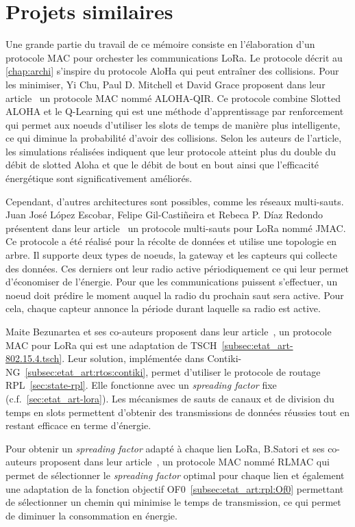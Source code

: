 \section{Projets similaires}\label{sec:etat_art-related-work}
\renewcommand{\rightmark}{Projet similaires}

Une grande partie du travail de ce mémoire consiste en l'élaboration d'un protocole MAC pour
orchester les communications LoRa. Le protocole décrit au \autoref{chap:archi} s'inspire du
protocole AloHa qui peut entraîner des collisions. Pour les minimiser, Yi Chu, Paul D. Mitchell et
David Grace proposent dans leur article~\cite{6328420} un protocole MAC nommé ALOHA-QIR. Ce
protocole combine Slotted ALOHA et le Q-Learning qui est une méthode d'apprentissage par
renforcement qui permet aux noeuds d'utiliser les slots de temps de manière plus intelligente, ce qui diminue la probabilité d'avoir des collisions. Selon les auteurs de l'article, les simulations réalisées indiquent que leur
protocole atteint plus du double du débit de slotted Aloha et que le débit de bout en bout ainsi
que l'efficacité énergétique sont significativement améliorés.


Cependant, d'autres architectures sont possibles, comme les réseaux multi-sauts.
Juan José López Escobar, Felipe Gil-Castiñeira et Rebeca P. Díaz Redondo présentent dans leur 
article~\cite{s20236893} un protocole multi-sauts pour LoRa nommé JMAC. Ce protocole a été réalisé 
pour la récolte de données et utilise une topologie en arbre. Il supporte deux types de noeuds, la 
gateway et les capteurs qui collecte des données. Ces derniers ont leur radio active périodiquement 
ce qui leur permet d'économiser de l'énergie. Pour que les communications puissent s'effectuer, un 
noeud doit prédire le moment auquel la radio du prochain saut sera active. Pour cela, chaque 
capteur annonce la période durant laquelle sa radio est active.


Maite Bezunartea et ses co-auteurs proposent dans leur article~\cite{8847137}, un protocole MAC pour LoRa qui est une adaptation de TSCH~\ref{subsec:etat_art-802.15.4.tsch}. Leur solution, implémentée dans Contiki-NG~\ref{subsec:etat_art:rtos:contiki}, permet d'utiliser le protocole de routage RPL~\ref{sec:state-rpl}. Elle fonctionne avec un \textit{spreading factor} fixe (c.f.~\ref{sec:etat_art-lora}). Les mécanismes de sauts de canaux et de division du temps en slots permettent d'obtenir des transmissions de données réussies tout en restant efficace en terme d'énergie.

Pour obtenir un \textit{spreading factor} adapté à chaque lien LoRa, B.Satori et ses co-auteurs proposent dans leur article~\cite{8115756}, un protocole MAC nommé RLMAC qui permet de sélectionner le \textit{spreading factor} optimal pour chaque lien et également une adaptation de la fonction objectif OF0~\ref{subsec:etat_art:rpl:Of0} permettant de sélectionner un chemin qui minimise le temps de transmission, ce qui permet de diminuer la consommation en énergie.



